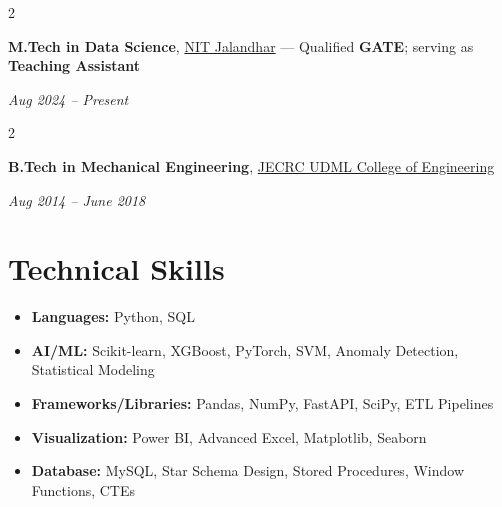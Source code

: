 \documentclass[10pt, letterpaper]{article}
\newenvironment{highlights}{
    \begin{itemize}[
        topsep=0.10 cm,
        parsep=0.10 cm,
        partopsep=0pt,
        itemsep=0pt,
        leftmargin=10pt
    ]
}{
    \end{itemize}
}
\newenvironment{twocolentry}[2][]{
    \onecolentry
    \def\secondColumn{#2}
    \setcolumnwidth{\fill, 4.5 cm}
    \begin{paracol}{2}
}{
    \switchcolumn \raggedleft \secondColumn
    \end{paracol}
    \endonecolentry
}
\begin{document}
\begin{twocolentry}{\textit{Aug 2024 -- Present}}
\textbf{M.Tech in Data Science}, \textcolor{myblue}{\underline{NIT Jalandhar}} — Qualified \textbf{GATE}; serving as \textbf{Teaching Assistant}
\end{twocolentry}

\vspace{0.08cm}

\begin{twocolentry}{\textit{Aug 2014 -- June 2018}}
\textbf{B.Tech in Mechanical Engineering}, \textcolor{myblue}{\underline{JECRC UDML College of Engineering}}
\end{twocolentry}

\section{\textcolor{myblue}{\textbf{Technical Skills}}}

\begin{highlights}
\item \textbf{Languages:} Python, SQL
\item \textbf{AI/ML:} Scikit-learn, XGBoost, PyTorch, SVM, Anomaly Detection, Statistical Modeling
\item \textbf{Frameworks/Libraries:} Pandas, NumPy, FastAPI, SciPy, ETL Pipelines
\item \textbf{Visualization:} Power BI, Advanced Excel, Matplotlib, Seaborn
\item \textbf{Database:} MySQL, Star Schema Design, Stored Procedures, Window Functions, CTEs
\end{highlights}
\end{document}
